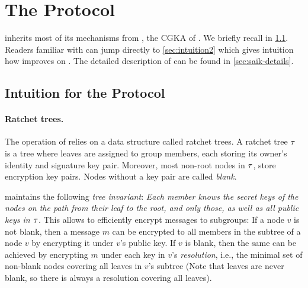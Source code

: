 
\section{The \saik Protocol}\label{sec:saik}
\saik inherits most of its mechanisms from \protITK, the CGKA of \mls. We briefly recall \protITK in
\cref{sec:intuition1}.
Readers familiar with \protITK can jump directly to \cref{sec:intuition2} which gives intuition how \saik improves on \protITK. The detailed description of \saik can be found in \cref{sec:saik-details}.

\subsection{Intuition for the \protITK Protocol}\label{sec:intuition1}

\paragraph{Ratchet trees.}
The operation of \protITK relies on a data structure called ratchet trees. A ratchet tree $\tau$ is a tree where leaves are assigned to group members, each storing its owner's identity and signature key pair. Moreover, most non-root nodes in $\tau$, store encryption key pairs. Nodes without a key pair are called \emph{blank}.

\protITK maintains the following \emph{tree invariant}:
  {\it Each member knows the secret keys of the nodes on the path from their leaf to the root, and only those, as well as all public keys in $\tau$.}
This allows to efficiently encrypt messages to subgroups: If a node $v$ is not blank, then a message $m$ can be
encrypted to all members in the subtree of a node $v$ by encrypting it under $v$'s public key. If $v$ is blank, then the
same can be achieved by encrypting $m$ under each key in $v$'s \emph{resolution}, i.e., the minimal set of non-blank
nodes covering all leaves in $v$'s subtree (Note that leaves are never blank, so there is always a resolution covering
all leaves).


